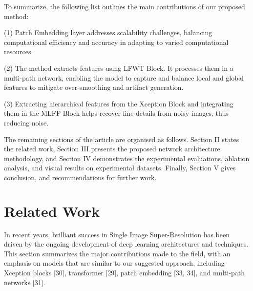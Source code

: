 \documentclass[twocolumn]{svjour3}          %
\begin{document}
To summarize, the following list outlines the main contributions of our proposed method:

(1) Patch Embedding layer addresses scalability challenges, balancing computational efficiency and accuracy in adapting to varied computational resources. 

(2) The method extracts features using LFWT Block. It processes them in a multi-path network, enabling the model to capture and balance local and global features to mitigate over-smoothing and artifact generation. 

(3) Extracting hierarchical features from the Xception Block and integrating them in the MLFF Block helps recover fine details from noisy images, thus reducing noise.  

The remaining sections of the article are organised as follows. Section II states the related work, Section III presents the proposed network architecture methodology, and Section IV demonstrates the experimental evaluations, ablation analysis, and visual results on experimental datasets. Finally, Section V gives conclusion, and recommendations for further work.

\section{Related Work}

In recent years, brilliant success in Single Image Super-Resolution has been driven by the ongoing development of deep learning architectures and techniques. This section summarizes the major contributions made to the field, with an emphasis on models that are similar to our suggested approach, including Xception blocks [30], transformer [29], patch embedding [33, 34], and multi-path networks [31].
\end{document}
